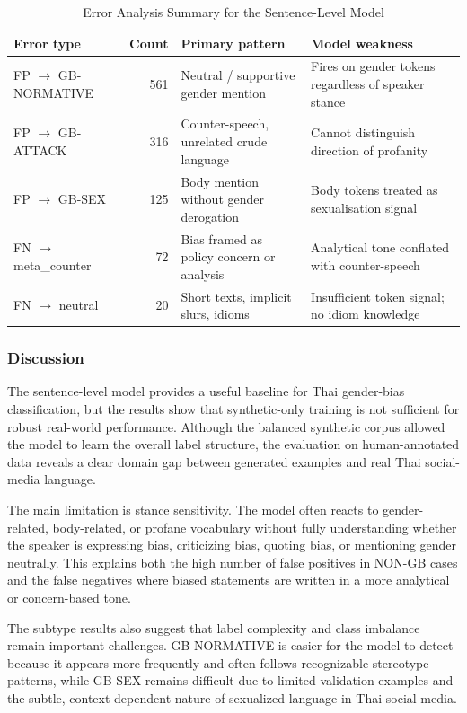 \documentclass[12pt,oneside,openright,a4paper]{cpe-english-project}
\begin{document}
\begin{table}[H]
\centering
\small
\caption{Error Analysis Summary for the Sentence-Level Model}
\begin{tabularx}{\textwidth}{@{}l r >{\raggedright\arraybackslash}X >{\raggedright\arraybackslash}X@{}}
\toprule
\textbf{Error type} & \textbf{Count} & \textbf{Primary pattern} & \textbf{Model weakness} \\
\midrule
FP $\rightarrow$ GB-NORMATIVE & 561 & Neutral / supportive gender mention & Fires on gender tokens regardless of speaker stance \\
FP $\rightarrow$ GB-ATTACK & 316 & Counter-speech, unrelated crude language & Cannot distinguish direction of profanity \\
FP $\rightarrow$ GB-SEX & 125 & Body mention without gender derogation & Body tokens treated as sexualisation signal \\
FN $\rightarrow$ meta\_counter & 72 & Bias framed as policy concern or analysis & Analytical tone conflated with counter-speech \\
FN $\rightarrow$ neutral & 20 & Short texts, implicit slurs, idioms & Insufficient token signal; no idiom knowledge \\
\bottomrule
\end{tabularx}
\end{table}

\subsubsection{Discussion}

The sentence-level model provides a useful baseline for Thai gender-bias classification, but the results show that synthetic-only training is not sufficient for robust real-world performance. Although the balanced synthetic corpus allowed the model to learn the overall label structure, the evaluation on human-annotated data reveals a clear domain gap between generated examples and real Thai social-media language.

The main limitation is stance sensitivity. The model often reacts to gender-related, body-related, or profane vocabulary without fully understanding whether the speaker is expressing bias, criticizing bias, quoting bias, or mentioning gender neutrally. This explains both the high number of false positives in NON-GB cases and the false negatives where biased statements are written in a more analytical or concern-based tone.

The subtype results also suggest that label complexity and class imbalance remain important challenges. GB-NORMATIVE is easier for the model to detect because it appears more frequently and often follows recognizable stereotype patterns, while GB-SEX remains difficult due to limited validation examples and the subtle, context-dependent nature of sexualized language in Thai social media.
\end{document}
